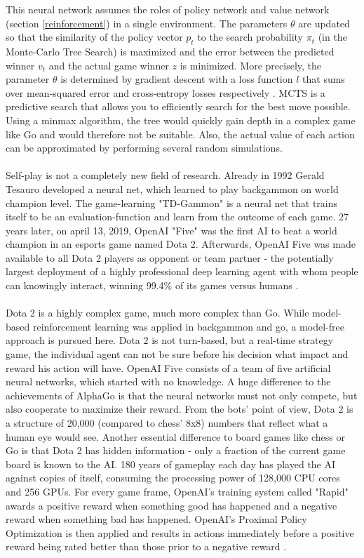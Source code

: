 This neural network assumes the roles of policy network and value network (section \ref{reinforcement}) in a single environment.  The parameters $\theta$ are updated so that the similarity of the policy vector \textbf{$p_t$} to the search probability \textbf{$\pi_t$} (in the Monte-Carlo Tree Search) is maximized and the error between the predicted winner $v_t$ and the actual game winner $z$ is minimized. More precisely, the parameter $\theta$ is determined by gradient descent with a loss function $l$ that sums over mean-squared error and cross-entropy losses respectively \cite{GoalphaGosilver2017mastering}.
MCTS is a predictive search that allows you to efficiently search for the best move possible. Using a minmax algorithm, the tree would quickly gain depth in a complex game like Go and would therefore not be suitable. Also, the actual value of each action can be approximated by performing several random simulations.
\\
\\
Self-play is not a completely new field of research. Already in 1992 Gerald Tesauro \cite{TDGammontesauro1992practical,TD2Gammontesauro1995temporal} developed a neural net, which learned to play backgammon on world champion level. The game-learning "TD-Gammon" is a neural net that trains itself to be an evaluation-function and learn from the outcome of each game.
27 years later, on april 13, 2019, OpenAI "Five" was the first AI to beat a world champion in an esports game named Dota 2. Afterwards, OpenAI Five was made available to all Dota 2 players as opponent or team partner - the potentially largest deployment of a highly professional deep learning agent with whom people can knowingly interact, winning 99.4\% of its games versus humans \cite{dotaOpenAI2019Jun}.\\ 
\\
Dota 2 is a highly complex game, much more complex than Go. While model-based reinforcement learning was applied in backgammon and go, a model-free approach is pursued here. Dota 2 is not turn-based, but a real-time strategy game, the individual agent can not be sure before his decision what impact and reward his action will have. OpenAI Five consists of a team of five artificial neural networks, which started with no knowledge. A huge difference to the achievements of AlphaGo is that the neural networks must not only compete, but also cooperate to maximize their reward. From the bots' point of view, Dota 2 is a structure of 20,000 (compared to chess' 8x8) numbers that reflect what a human eye would see. Another essential difference to board games like chess or Go is that Dota 2 has hidden information - only a fraction of the current game board is known to the AI. 180 years of gameplay each day has played the AI against copies of itself, consuming the processing power of 128,000 CPU cores and 256 GPUs. For every game frame, OpenAI's training system called "Rapid" awards a positive reward when something good has happened and a negative reward when something bad has happened. OpenAI's Proximal Policy Optimization \cite{ppoSchulman2019Mar} is then applied and results in actions immediately before a positive reward being rated better than those prior to a negative reward \cite{dotaOpenAI2019Jun}.\\
